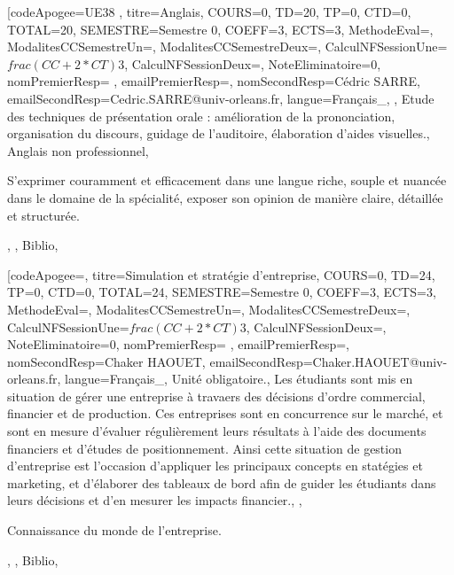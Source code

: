 

\module[codeApogee={UE38 },
titre={Anglais},
COURS={0},
TD={20},
TP={0},
CTD={0},
TOTAL={20},
SEMESTRE={Semestre 0},
COEFF={3},
ECTS={3},
MethodeEval={},
ModalitesCCSemestreUn={},
ModalitesCCSemestreDeux={},
CalculNFSessionUne={$frac{(CC+2*CT)}{3}$},
CalculNFSessionDeux={},
NoteEliminatoire={0},
nomPremierResp={ },
emailPremierResp={},
nomSecondResp={Cédric SARRE},
emailSecondResp={Cedric.SARRE@univ-orleans.fr},
langue={Français_},
{},
{Etude des techniques de présentation orale : amélioration de la prononciation, organisation du discours, guidage de l'auditoire, élaboration d'aides visuelles.},
{Anglais non professionnel},
{\begin{itemize}
\ObjItem S'exprimer couramment et efficacement dans une langue riche, souple et nuancée dans le domaine de la spécialité, exposer son opinion de manière claire, détaillée et structurée.
\end{itemize}},
{},
{Biblio},

\vfill


\module[codeApogee={},
titre={Simulation et stratégie d'entreprise},
COURS={0},
TD={24},
TP={0},
CTD={0},
TOTAL={24},
SEMESTRE={Semestre 0},
COEFF={3},
ECTS={3},
MethodeEval={},
ModalitesCCSemestreUn={},
ModalitesCCSemestreDeux={},
CalculNFSessionUne={$frac{(CC+2*CT)}{3}$},
CalculNFSessionDeux={},
NoteEliminatoire={0},
nomPremierResp={ },
emailPremierResp={},
nomSecondResp={Chaker HAOUET},
emailSecondResp={Chaker.HAOUET@univ-orleans.fr},
langue={Français_},
{Unité obligatoire.},
{Les étudiants sont mis en situation de gérer une entreprise à travaers des décisions d'ordre commercial, financier et de production. Ces entreprises sont en concurrence sur le marché, et sont en mesure d'évaluer régulièrement leurs résultats à l'aide des documents financiers et d'études de positionnement. Ainsi cette situation de gestion d'entreprise est l'occasion d'appliquer les principaux concepts en statégies et marketing, et d'élaborer des tableaux de bord afin de guider les étudiants dans leurs décisions et d'en mesurer les impacts financier.},
{},
{\begin{itemize}
\ObjItem Connaissance du monde de l'entreprise.
\end{itemize}},
{},
{Biblio},

